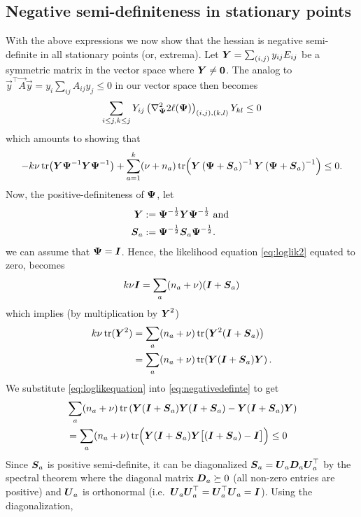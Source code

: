 \documentclass{article}\usepackage[]{graphicx}\usepackage[]{color}
\begin{document}
\subsection{Negative semi-definiteness in stationary points}
With the above expressions we now show that the hessian is negative semi-definite in all stationary points (or, extrema).
Let ${\boldsymbol{Y}} = \sum_{(i,j)} y_{ij}E_{ij}$ be a symmetric matrix in the vector space where ${\boldsymbol{Y}} \neq \boldsymbol{0}$. The analog to $\vec{y}^\top \vec{A}\vec{y} = y_i \sum_{ij} A_{ij} y_j \leq 0$ in our vector space then becomes
\begin{align*}
  \sum_{i\leq j, k\leq j}
    Y_{ij}
    \left(\nabla^2_{\boldsymbol{\Psi}} 2\ell({\boldsymbol{\Psi}})\right)_{(i,j),(k,l)}
    Y_{kl} \leq 0
\end{align*}
which amounts to showing that
\small
\begin{align}
- k\nu\operatorname*{tr}\!\left( {\boldsymbol{Y}}{\boldsymbol{\Psi}}^{-1} {\boldsymbol{Y}}{\boldsymbol{\Psi}}^{-1} \right)
+ \sum_{a = 1}^k (\nu + n_a)
    \operatorname*{tr}\!\left(
      {\boldsymbol{Y}}\left({\boldsymbol{\Psi}} + {\boldsymbol{S}}_a\right)^{-1}
      {\boldsymbol{Y}}\left({\boldsymbol{\Psi}} + {\boldsymbol{S}}_a\right)^{-1}
    \right) \leq 0.
  \label{eq:negativedefinte}
\end{align}
\normalsize
Now, the positive-definiteness of ${\boldsymbol{\Psi}}$, let
\begin{align*}
  {\boldsymbol{Y}} &:= {\boldsymbol{\Psi}}^{-\frac{1}{2}} {\boldsymbol{Y}} {\boldsymbol{\Psi}}^{-\frac{1}{2}} \text{ and } \\
  {\boldsymbol{S}}_a &:= {\boldsymbol{\Psi}}^{-\frac{1}{2}} {\boldsymbol{S}}_a  {\boldsymbol{\Psi}}^{-\frac{1}{2}}.
\end{align*}
we can assume that ${\boldsymbol{\Psi}} = {\boldsymbol{I}}$. Hence, the likelihood equation \eqref{eq:loglik2} equated to zero, becomes
\begin{align*}
  k\nu{\boldsymbol{I}} = \sum_a(n_a + \nu)({\boldsymbol{I}} + {\boldsymbol{S}}_a)
\end{align*}
which implies (by multiplication by ${\boldsymbol{Y}}^2$)
\begin{align}
  k\nu\operatorname*{tr}({\boldsymbol{Y}}^2)
  &= \sum_a (n_a + \nu)\operatorname*{tr}\!\left({\boldsymbol{Y}}^2({\boldsymbol{I}} + {\boldsymbol{S}}_a)\right) \notag\\
  &= \sum_a (n_a + \nu)\operatorname*{tr}\!\left({\boldsymbol{Y}}({\boldsymbol{I}} + {\boldsymbol{S}}_a){\boldsymbol{Y}}\right).
  \label{eq:loglikequation}
\end{align}
We substitute \eqref{eq:loglikequation} into \eqref{eq:negativedefinte} to get
\begin{align*}
  &\sum_a (n_a + \nu)\operatorname*{tr}\left({\boldsymbol{Y}} ({\boldsymbol{I}} + {\boldsymbol{S}}_a) {\boldsymbol{Y}} ({\boldsymbol{I}} + {\boldsymbol{S}}_a) - {\boldsymbol{Y}} ({\boldsymbol{I}} + {\boldsymbol{S}}_a) {\boldsymbol{Y}} \right) \\
  &=  \sum_a (n_a + \nu)\operatorname*{tr}\!\Big( {\boldsymbol{Y}} ({\boldsymbol{I}} + {\boldsymbol{S}}_a) {\boldsymbol{Y}} \big[ ({\boldsymbol{I}} + {\boldsymbol{S}}_a)  - {\boldsymbol{I}} \big]\Big)
  \leq 0
\end{align*}
Since ${\boldsymbol{S}}_a$ is positive semi-definite, it can be diagonalized ${\boldsymbol{S}}_a = {\boldsymbol{U}}_a {\boldsymbol{D}}_a {\boldsymbol{U}}_a^\top$ by the spectral theorem where the diagonal matrix ${\boldsymbol{D}}_a \succeq 0$ (all non-zero entries are positive) and ${\boldsymbol{U}}_a$ is orthonormal (i.e.\ ${\boldsymbol{U}}_a{\boldsymbol{U}}_a^\top = {\boldsymbol{U}}_a^\top{\boldsymbol{U}}_a = {\boldsymbol{I}}$). Using the diagonalization,
\end{document}
